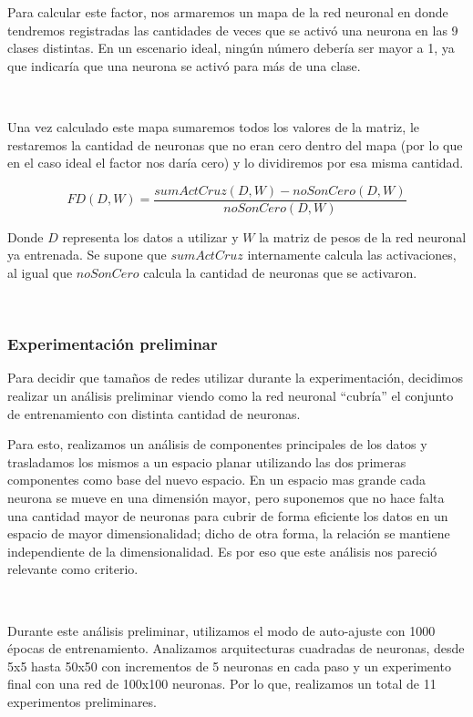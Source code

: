 \documentclass[informe.tex]{subfiles}
\begin{document}
      Para calcular este factor, nos armaremos un mapa de la red neuronal en donde tendremos registradas las cantidades de veces que se activó una neurona en las 9 clases distintas. En un escenario ideal, ningún número debería ser mayor a 1, ya que indicaría que una neurona se activó para más de una clase.
      
      ~
      
      Una vez calculado este mapa sumaremos todos los valores de la matriz, le restaremos la cantidad de neuronas que no eran cero dentro del mapa (por lo que en el caso ideal el factor nos daría cero) y lo dividiremos por esa misma cantidad.
      
      $$FD(D, W) = \frac{sumActCruz(D, W) - noSonCero(D, W)}{noSonCero(D, W)}$$
      
      Donde $D$ representa los datos a utilizar y $W$ la matriz de pesos de la red neuronal ya entrenada. Se supone que $sumActCruz$ internamente calcula las activaciones, al igual que $noSonCero$ calcula la cantidad de neuronas que se activaron.
      
      ~

      \subsubsection{Experimentaci\'on preliminar}
      Para decidir que tama\~nos de redes utilizar durante la experimentaci\'on, decidimos realizar un an\'alisis preliminar viendo como la red neuronal ``cubr\'ia'' el conjunto de entrenamiento con distinta cantidad de neuronas.
      ~
      
      Para esto, realizamos un an\'alisis de componentes principales de los datos y trasladamos los mismos a un espacio planar utilizando las dos primeras componentes como base del nuevo espacio. En un espacio mas grande cada neurona se mueve en una dimensi\'on mayor, pero suponemos que no hace falta una cantidad mayor de neuronas para cubrir de forma eficiente los datos en un espacio de mayor dimensionalidad; dicho de otra forma, la relaci\'on se mantiene independiente de la dimensionalidad. Es por eso que este an\'alisis nos pareci\'o relevante como criterio.
      
      ~
      
      Durante este an\'alisis preliminar, utilizamos el modo de auto-ajuste con 1000 \'epocas de entrenamiento. Analizamos arquitecturas cuadradas de neuronas, desde 5x5 hasta 50x50 con incrementos de 5 neuronas en cada paso y un experimento final con una red de 100x100 neuronas. Por lo que, realizamos un total de 11 experimentos preliminares.
      
\end{document}
